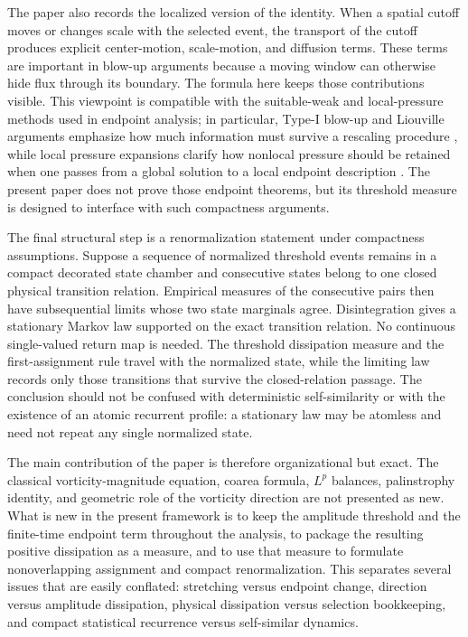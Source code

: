 \documentclass[11pt]{article}
\theoremstyle{definition}\newtheorem{definition}[theorem]{Definition}
\theoremstyle{remark}\newtheorem{remark}[theorem]{Remark}
\begin{document}
The paper also records the localized version of the identity.  When a spatial cutoff moves or changes scale with the selected event, the transport of the cutoff produces explicit center-motion, scale-motion, and diffusion terms.  These terms are important in blow-up arguments because a moving window can otherwise hide flux through its boundary.  The formula here keeps those contributions visible.  This viewpoint is compatible with the suitable-weak and local-pressure methods used in endpoint analysis; in particular, Type-I blow-up and Liouville arguments emphasize how much information must survive a rescaling procedure \cite{AlbrittonBarker2019}, while local pressure expansions clarify how nonlocal pressure should be retained when one passes from a global solution to a local endpoint description \cite{BradshawTsai2022}.  The present paper does not prove those endpoint theorems, but its threshold measure is designed to interface with such compactness arguments.

The final structural step is a renormalization statement under compactness assumptions.  Suppose a sequence of normalized threshold events remains in a compact decorated state chamber and consecutive states belong to one closed physical transition relation.  Empirical measures of the consecutive pairs then have subsequential limits whose two state marginals agree.  Disintegration gives a stationary Markov law supported on the exact transition relation.  No continuous single-valued return map is needed.  The threshold dissipation measure and the first-assignment rule travel with the normalized state, while the limiting law records only those transitions that survive the closed-relation passage.  The conclusion should not be confused with deterministic self-similarity or with the existence of an atomic recurrent profile: a stationary law may be atomless and need not repeat any single normalized state.

The main contribution of the paper is therefore organizational but exact.  The classical vorticity-magnitude equation, coarea formula, $L^p$ balances, palinstrophy identity, and geometric role of the vorticity direction are not presented as new.  What is new in the present framework is to keep the amplitude threshold and the finite-time endpoint term throughout the analysis, to package the resulting positive dissipation as a measure, and to use that measure to formulate nonoverlapping assignment and compact renormalization.  This separates several issues that are easily conflated: stretching versus endpoint change, direction versus amplitude dissipation, physical dissipation versus selection bookkeeping, and compact statistical recurrence versus self-similar dynamics.
\end{document}
